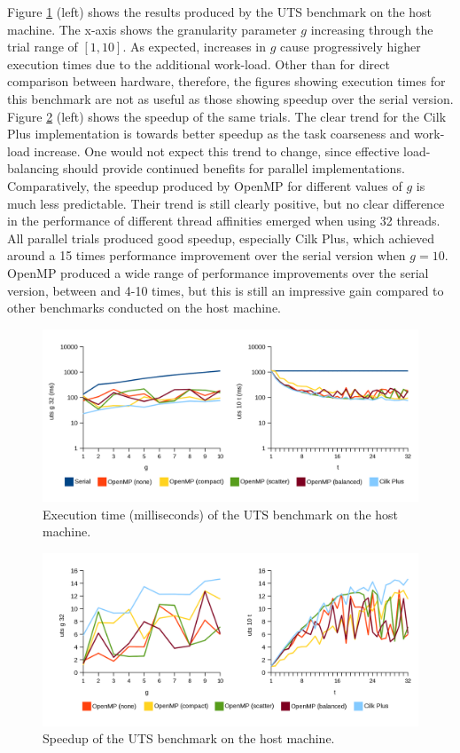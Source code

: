 \documentclass{report}
\begin{document}
Figure \ref{Fig:utshosttime} (left) shows the results produced by the UTS benchmark on the host machine. The x-axis shows the granularity parameter \(g\) increasing through the trial range of \([1,10]\). As expected, increases in \(g\) cause progressively higher execution times due to the additional work-load. Other than for direct comparison between hardware, therefore, the figures showing execution times for this benchmark are not as useful as those showing speedup over the serial version. Figure \ref{Fig:utshostspeedup} (left) shows the speedup of the same trials. The clear trend for the Cilk Plus implementation is towards better speedup as the task coarseness and work-load increase. One would not expect this trend to change, since effective load-balancing should provide continued benefits for parallel implementations. Comparatively, the speedup produced by OpenMP for different values of \(g\) is much less predictable. Their trend is still clearly positive, but no clear difference in the performance of different thread affinities emerged when using 32 threads. All parallel trials produced good speedup, especially Cilk Plus, which achieved around a 15 times performance improvement over the serial version when \(g=10\). OpenMP produced a wide range of performance improvements over the serial version, between and 4-10 times, but this is still an impressive gain compared to other benchmarks conducted on the host machine.
\noindent
\begin{figure}[t!]
	\includegraphics[width=\linewidth]{../../charts/intel64/uts_time}
	\caption{Execution time (milliseconds) of the UTS benchmark on the host machine.}
	\label{Fig:utshosttime}
\end{figure}
\noindent
\begin{figure}[t!]
	\includegraphics[width=\linewidth]{../../charts/intel64/uts_speedup}
	\caption{Speedup of the UTS benchmark on the host machine.}
	\label{Fig:utshostspeedup}
\end{figure}
\end{document}
